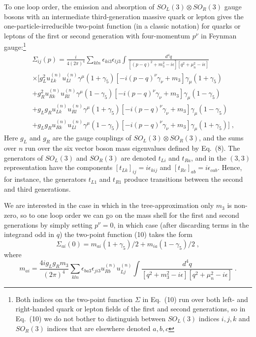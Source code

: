 \documentclass[12pt]{article}
\begin{document}
To one loop order, the emission and absorption of $SO_L(3)\otimes  SO_R(3)$ gauge bosons with an intermediate third-generation massive quark or lepton  gives the one-particle-irreducible  two-point function (in a classic notation) for quarks or leptons of the first or second generation with four-momentum $p^\nu$ in Feynman gauge:\footnote{Both indices on the two-point function $\Sigma$ in Eq.~(10) run over both left- and right-handed quark or lepton fields of the first and second generations, so in Eq.~(10) we do not bother to distinguish between  $SO_L(3)$  indices $i,j,k$ and $SO_R(3)$ indices that are elsewhere denoted $a, b, c$} 
\begin{eqnarray}
&& \Sigma_{ij}(p)=\frac{i}{4(2\pi)^4}\sum_{kln}\epsilon_{ki3}\epsilon_{lj3} \int \frac{d^4q}{[(p-q)^2+m_3^2-i\epsilon][q^2+\mu_n^2-i\epsilon]}\nonumber\\
&& \times \Bigg[g_L^2 u_{Lk}^{(n)}u_{Ll}^{(n)}\gamma^\mu (1+\gamma_5)[-i(p-q)^\nu\gamma_\nu+m_3]\gamma_\mu (1+\gamma_5)\nonumber\\
&&+g_R^2 u_{Rk}^{(n)}u_{Rl}^{(n)}\gamma^\mu(1-\gamma_5)[-i(p-q)^\nu\gamma_\nu+m_3]\gamma_\mu(1-\gamma_5)\nonumber\\
&& +g_L g_Ru_{Lk}^{(n)}u_{Rl}^{(n)}\gamma^\mu (1+\gamma_5)[-i(p-q)^\nu\gamma_\nu+m_3]\gamma_\mu (1-\gamma_5)\nonumber\\
&&+g_Lg_R u_{Rk}^{(n)}u_{Ll}^{(n)} \gamma^\mu (1-\gamma_5)[-i(p-q)^\nu\gamma_\nu+m_3]\gamma_\mu (1+\gamma_5)\Bigg]\;,
\end{eqnarray}
Here $g_L$ and $g_R$ are the gauge couplings of $SO_L(3)\otimes  SO_R(3)$, and 
the sums over $n$ run over the  six vector boson mass eigenvalues defined by Eq.~(8).  The generators of  $SO_L(3)$  and  $SO_R(3)$ are denoted $t_{Li}$ and $t_{Ra}$, and in the $(3,3)$ representation have the components $[t_{Lk}]_{ij}=i\epsilon_{kij}$ and $[t_{Rc}]_{ab}=i\epsilon_{cab}$.  Hence, for instance, the generators 
$t_{L1}$ and $t_{R1}$ produce transitions between the second and third generations.


We are interested in the case  in which in the tree-approximation only $m_3$ is non-zero, so to one loop order we can go on the mass shell for the first and second generations by simply setting $p^\nu=0$, in   which case (after discarding terms in the integrand odd in $q$)  the two-point function (10) takes the form
\begin{equation}
\Sigma_{ai}(0)=m_{ai}(1+\gamma_5)/2+m_{ia}(1-\gamma_5)/2\;,
\end{equation}
where 
\begin{equation}
m_{ai}=\frac{4ig_Lg_Rm_3}{(2\pi)^4}\sum_{kln}\epsilon_{ba3}\epsilon_{ji3}  u_{Rb}^{(n)}u_{Lj}^{(n)} \int \frac{d^4q}{[q^2+m_3^2-i\epsilon][q^2+\mu_n^2-i\epsilon]}\;.
\end{equation}
\end{document}
